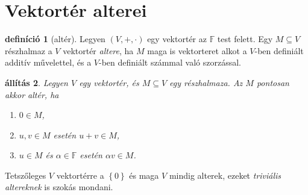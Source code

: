 \documentclass[9pt, a4paper, showtrims]{memoir}
\theoremstyle{plain}
\newtheorem{proposition}{állítás}[chapter]
\theoremstyle{remark}
\theoremstyle{definition}
\newtheorem{definition}[proposition]{definíció}
\begin{document}
\section{Vektortér alterei}
\begin{definition}[altér]
    Legyen $\left( V,+,\cdot \right)$ egy vektortér az $\mathbb{F}$ test felett.
    Egy $M\subseteq V$ részhalmaz a $V$ vektortér \emph{altere},
    ha $M$ maga is vektorteret alkot a $V$-ben definiált additív művelettel, 
    és a $V$-ben definiált számmal való szorzással.
\end{definition}
\begin{proposition}
    Legyen $V$ egy vektortér, és $M\subseteq V$ egy részhalmaza.
    Az $M$ pontosan akkor altér,
    ha
    \begin{enumerate}
        \item $0\in M$,
        \item $u,v\in M$ esetén $u+v\in M$,
        \item $u\in M$ és $\alpha\in\mathbb{F}$ esetén $\alpha v\in M$.\qedhere
    \end{enumerate}
\end{proposition}
Tetszőleges $V$ vektortérre a $\left\{ 0 \right\}$ és maga $V$ mindig alterek,
ezeket \emph{triviális altereknek} is szokás mondani.
\end{document}
